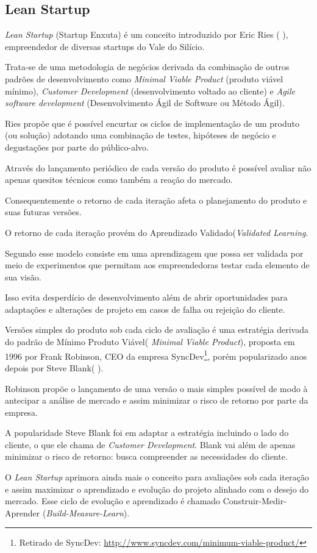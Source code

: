\subsection{Lean Startup}
\par \emph{Lean Startup} (Startup Enxuta) é um conceito introduzido por Eric Ries ( \cite{ries:11}), empreendedor de diversas startups do Vale do Silício.
\par Trata-se de uma metodologia de negócios derivada da combinação de outros padrões de desenvolvimento como \emph{Minimal Viable Product} (produto viável mínimo), \emph{Customer Development} (desenvolvimento voltado ao cliente) e \emph{Agile software development} (Desenvolvimento Ágil de Software ou Método Ágil).
\par Ries propõe que é possível encurtar os ciclos de implementação de um produto (ou solução) adotando uma combinação de testes, hipóteses de negócio e degustações por parte do público-alvo. 
\par Através do lançamento periódico de cada versão do produto é possível avaliar não apenas quesitos técnicos como também a reação do mercado. 
\par Consequentemente o retorno de cada iteração afeta o planejamento do produto e suas futuras versões.
\par O retorno de cada iteração provém do Aprendizado Validado(\emph{Validated Learning}.
\par Segundo \cite{ries:11} esse modelo consiste em uma aprendizagem que possa ser validada por meio de experimentos que permitam aos empreendedoras testar cada elemento de sua visão.
\par Isso evita desperdício de desenvolvimento além de abrir oportunidades para adaptações e alterações de projeto em casos de falha ou rejeição do cliente.
\par Versões simples do produto sob cada ciclo de avaliação é uma estratégia derivada do padrão de Mínimo Produto Viável( \emph{Minimal Viable Product}), proposta em 1996 por Frank Robinson, CEO da empresa SyncDev\footnote{ Retirado de SyncDev: \url{http://www.syncdev.com/minimum-viable-product/}}, porém popularizado anos depois por Steve Blank( \cite{junk:2000}).
\par Robinson propõe o lançamento de uma versão o mais simples possível de modo à antecipar a análise de mercado e assim minimizar o risco de retorno por parte da empresa.
\par A popularidade Steve Blank foi em adaptar a estratégia incluindo o lado do cliente, o que ele chama de \emph{Customer Development}. Blank vai além de apenas minimizar o risco de retorno: busca compreender as necessidades do cliente.
\par O \emph{Lean Startup} aprimora ainda mais o conceito para avaliações sob cada iteração e assim maximizar o aprendizado e evolução do projeto alinhado com o desejo do mercado. Esse ciclo de evolução e aprendizado é chamado Construir-Medir-Aprender (\emph{Build-Measure-Learn}).

